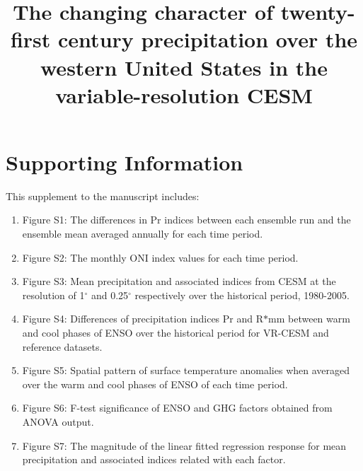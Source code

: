 \documentclass{ametsoc}
\title{The changing character of twenty-first century precipitation over the western United States in the variable-resolution CESM}
\affiliation{Department of Land, Air and Water Resources, University of California, Davis}
\begin{document}

\section{Supporting Information}

This supplement to the manuscript includes:

\begin{enumerate}

\item Figure S1: The differences in Pr indices between each ensemble run and the ensemble mean averaged annually for each time period.

\item Figure S2: The monthly ONI index values for each time period.

\item Figure S3: Mean precipitation and associated indices from CESM at the resolution of 1$^\circ$ and 0.25$^\circ$ respectively over the historical period, 1980-2005.

\item Figure S4: Differences of precipitation indices Pr and R$\ast$mm between warm and cool phases of ENSO over the historical period for VR-CESM and reference datasets.

\item Figure S5: Spatial pattern of surface temperature anomalies when averaged over the warm and cool phases of ENSO of each time period.

\item Figure S6: F-test significance of ENSO and GHG factors obtained from ANOVA output.

\item Figure S7: The magnitude of the linear fitted regression response for mean precipitation and associated indices related with each factor.

\end{enumerate}


%

\end{document}
